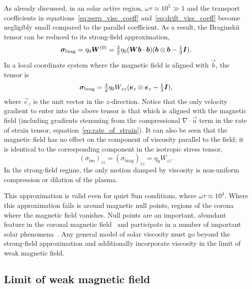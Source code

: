 As already discussed, in an solar active region, $\omega \tau \approx 10^5 \gg 1$ and the transport coefficients in equations~\ref{eq:perp_visc_coeff} and~\ref{eq:drift_visc_coeff} become negligibly small compared to the parallel coefficient. As a result, the Braginskii tensor can be reduced to its strong-field approximation,
\begin{equation}
  \label{eq:strong_field_approx}
{\bm \sigma}_{\text{brag}} = \eta_0 {\bm W}^{(0)} = \tfrac{3}{2} \eta_0 ({\bm W} {\bm b} \cdot {\bm b}) ( {\bm b} \otimes {\bm b} - \tfrac{1}{3} {\bm I}).
\end{equation}
In a local coordinate system where the magnetic field is aligned with $\vec{b}$, the tensor is
\begin{equation}
  \label{eq:z_aligned_strong_field_approx}
{\bm \sigma}_{\text{brag}} = \tfrac{3}{2} \eta_0 W_{zz} ( {\bm e}_z \otimes {\bm e}_z - \tfrac{1}{3} {\bm I}),
\end{equation}
where $\vec{e}_z$ is the unit vector in the $z$-direction. Notice that the only velocity gradient to enter into the above tensor is that which is aligned with the magnetic field (including gradients stemming from the compressional $\nabla \cdot \vec{u}$ term in the rate of strain tensor, equation~\ref{eq:rate_of_strain}). It can also be seen that the magnetic field has no effect on the component of viscosity parallel to the field; it is identical to the corresponding component in the isotropic stress tensor,
\begin{equation}
  \label{eq:z_aligned_iso}
  (\sigma_{\text{iso}})_{zz} = (\sigma_{\text{brag}})_{zz} = \eta_0 W_{zz}.
\end{equation}
In the strong-field regime, the only motion damped by viscosity is non-uniform compression or dilation of the plasma. 

This approximation is valid even for quiet Sun conditions, where $\omega\tau \approx 10^4$. Where this approximation fails is around magnetic null points, regions of the corona where the magnetic field vanishes. Null points are an important, abundant feature in the coronal magnetic field~\cite{edwardsNullPointDistribution2015} and participate in a number of important solar phenomena~\cite{massonNATUREFLARERIBBONS2009,moreno-insertisPLASMAJETSERUPTIONS2013,barnesRelationshipCoronalMagnetic2007}. Any general model of solar viscosity must go beyond the strong-field approximation and additionally incorporate viscosity in the limit of weak magnetic field.

\subsection{Limit of weak magnetic field}

